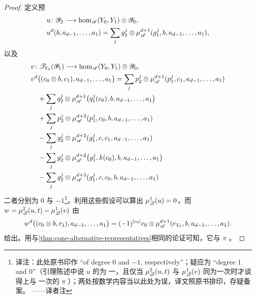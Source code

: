 \begin{proof}
定义预\trModule\trHomomorphism{}
\begin{equation*}
\begin{aligned}
&u\colon\mathscr{Y}_2\longrightarrow\hom_{\mathscr{A}}(Y_0,Y_1)\otimes\mathscr{Y}_0,\\
&u^d(b,a_{d-1},\ldots,a_1)
=\sum_j g_2^j\otimes\mu^{d+1}_{\mathscr{A}}(g_1^j,b,a_{d-1},\ldots,a_1),
\end{aligned}
\end{equation*}
以及
\begin{equation*}
\begin{aligned}
&v\colon\mathscr{T}_{Y_0}(\mathscr{Y}_1)\longrightarrow
\hom_{\mathscr{A}}(Y_0,Y_1)\otimes\mathscr{Y}_0,\\
&v^d\bigl((c_0\otimes b,c_1),a_{d-1},\ldots,a_1\bigr)
=\sum_j p_2^j\otimes\mu^{d+1}_{\mathscr{A}}(p_1^j,c_1,a_{d-1},\ldots,a_1)\\
&\quad+\sum_j q_2^j\otimes\mu^{d+1}_{\mathscr{A}}\bigl(q_1^j(c_0),b,a_{d-1},
\ldots,a_1\bigr)\\
&\quad+\sum_j p_2^j\otimes\mu^{d+2}_{\mathscr{A}}(p_1^j,c_0,b,a_{d-1},\ldots,a_1)\\
&\quad-\sum_j g_2^j\otimes\mu^{d+2}_{\mathscr{A}}(g_1^j,c,c_1,a_{d-1},\ldots,a_1)\\
&\quad-\sum_j g_2^j\otimes\mu^{d+2}_{\mathscr{A}}\bigl(g_1^j,k(c_0),b,a_{d-1},
\ldots,a_1\bigr)\\
&\quad-\sum_j g_2^j\otimes\mu^{d+3}_{\mathscr{A}}(g_1^j,c,c_0,b,a_{d-1},\ldots,a_1)
\end{aligned}
\end{equation*}
二者\trDegree{}分别为 $0$ 与 $-1$\footnote{译注：此处原书印作 “of degree 0 and
$-1$, respectively”；疑应为 “degree 1 and 0”（引理陈述中说 $u$ 的\trDegree{}为
一，且仅当 $\mu^2_{\mathscr{Q}}(u,t)$ 与 $\mu^1_{\mathscr{Q}}(v)$ 同为一次时才谈得上与
一次的 $\pi$ \trCohomology）；两处按数学内容当以此处为误，译文照原书排印，存疑备案。
——译者注}。利用这些假设可以算出 $\mu^1_{\mathscr{Q}}(u)=0$，而
$w=\mu^2_{\mathscr{Q}}(u,t)-\mu^1_{\mathscr{Q}}(v)$ 由
\begin{equation*}
w^d\bigl((c_0\otimes b,c_1),a_{d-1},\ldots,a_1\bigr)
=(-1)^{|c_0|}c_0\otimes\mu^{d+1}_{\mathscr{A}}(e_{Y_0},b,a_{d-1},\ldots,a_1).
\end{equation*}
给出。用与\cref{thm:cone-alternative-representatives}相同的论证可知，它与
$\pi$ \trCohomology。
\end{proof}

